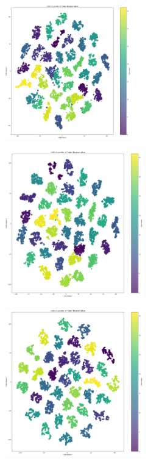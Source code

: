 \begin{multicols}{2}
\vspace{0.5cm}

\includegraphics[width=0.41\textwidth]{Assets/tSNE/DenseNet169.png}

\vspace{0.5cm}

\newpage

\includegraphics[width=0.45\textwidth]{Assets/tSNE/DENSENET201.png}

\vspace{0.5cm}

\includegraphics[width=0.45\textwidth]{Assets/tSNE/EfficientNetB0.png}

\vspace{0.5cm}



\end{multicols}
